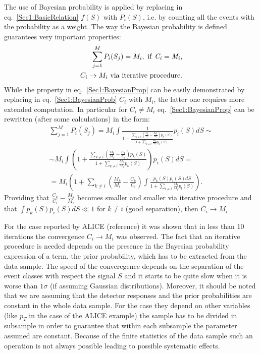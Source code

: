 The use of Bayesian probability is applied by replacing in eq.~\ref{Sec1:BasicRelation} $f(S)$ with $P_{i}(S)$, i.e. by counting all the events with the probability as a weight. The way the Bayesian probability is defined guarantees very important properties:
\begin{eqnarray}
\label{Sec1:BayesianProp}
\sum\limits_{j=1}^{M}P_{i}(S_j) = M_{i},{\rm\ if\ {\it C_{i} = M_{i}}}, \\
\label{Sec1:BayesianProp2}
C_{i} \rightarrow M_{i} {\rm\ via\ iterative\ procedure}.
\end{eqnarray}
While the property in eq.~\ref{Sec1:BayesianProp} can be easily demonstrated by replacing in eq.~\ref{Sec1:BayesianProb}  $C_{i}$ with $M_{i}$, the latter one requires more extended computation.
In particular for $C_{i} \neq M_{i}$ eq.~\ref{Sec1:BayesianProp} can be rewritten (after some calculations) in the form:
\begin{eqnarray}
\label{Sec1:BayesFullCalc}
\sum\limits_{j=1}^{M}P_{i}(S_j) = M_{i} \int \frac{1}{1+\frac{\sum\limits_{k \neq i} \left( \frac{C_k}{C_i} - \frac{M_k}{M_i} \right) p_{k}(S)}{1 + \sum\limits_{k \neq i} \frac{M_k}{M_i} p_k(S)}} p_{i}(S)dS \sim \\
\sim M_{i} \int  \left( 1+\frac{\sum\limits_{k \neq i} \left( \frac{M_k}{M_i} - \frac{C_k}{C_i} \right) p_{k}(S)}{1 + \sum\limits_{k \neq i} \frac{M_k}{M_i} p_k(S)} \right) p_{i}(S)dS = \\
= M_{i}  \left( 1 + \sum\limits_{k \neq i}  \left( \frac{M_k}{M_i} - \frac{C_k}{C_i} \right) \int  \frac{p_{k}(S)p_{i}(S)dS}{1+\sum\limits_{l \neq i} \frac{M_l}{M_i} p_l(S)} \right).
\end{eqnarray}
Providing that $\frac{C_k}{C_i} - \frac{M_k}{M_i}$ becomes smaller and smaller via iterative procedure and that $\int p_{k}(S)p_{i}(S)dS \ll 1$ for $k \neq i$ (good separation), then $C_i \rightarrow M_i$

For the case reported by ALICE (reference) it was shown that in less than 10 iterations the convergence $C_{i} \rightarrow M_{i}$ was observed.
The fact that an iterative procedure is needed depends on the presence in the
Bayesian probability expression of a term, the prior probability, which has to
be extracted from the data sample. The speed of the converegence depends on
the separation of the event classes with respect the signal $S$ and it starts
to be quite slow when it is worse than $1\sigma$ (if assuming Gaussian distributions).
Moreover, it should be noted that we are assuming that the detector responses and the prior probabilities are constant in the whole data sample.
For the case they depend on other variables (like $p_{T}$ in the case of the ALICE example) the sample has to be divided in subsample in order to guarantee that within each subsample the parameter assumed are constant. Because of the finite statistics of the data sample such an operation is not always possible leading to possible systematic effects.

